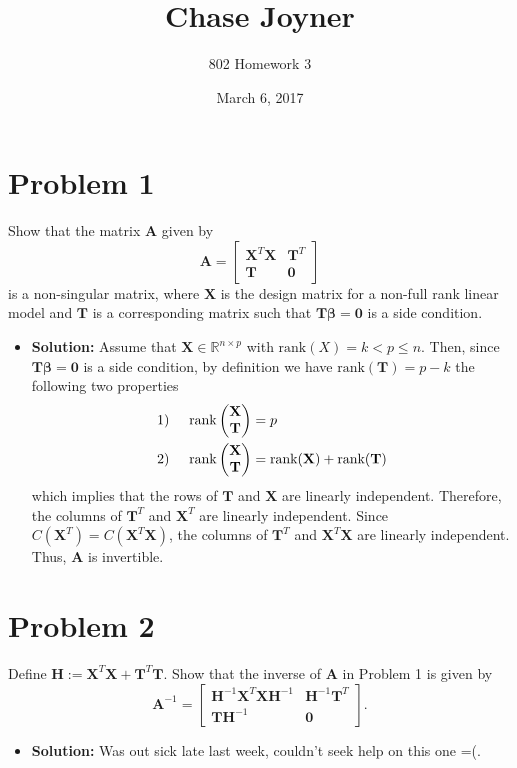 \documentclass[11pt]{article}
\title{Chase Joyner}
\author{802 Homework 3}
\date{March 6, 2017}
\newcommand{\XX}{\mathbf{X}^T\mathbf{X}}
\begin{document}
\maketitle

\section*{Problem 1}
Show that the matrix $\mathbf{A}$ given by
\[
\mathbf{A} = \begin{bmatrix}
\mathbf{X}^T\mathbf{X} & \mathbf{T}^T \\
\mathbf{T} & \mathbf{0}
\end{bmatrix}
\]
is a non-singular matrix, where $\mathbf{X}$ is the design matrix for a non-full rank linear model and $\mathbf{T}$ is a corresponding matrix such that $\mathbf{T}\bm\beta = \mathbf{0}$ is a side condition.
\begin{itemize}
\item[] \textbf{Solution:}  Assume that $\mathbf{X}\in\mathbb{R}^{n\times p}$ with $\text{rank}(X) = k<p\leq n$. Then, since $\mathbf{T}\bm\beta = \mathbf{0}$ is a side condition, by definition we have $\text{rank}(\mathbf{T}) = p - k$ the following two properties 
\begin{align*}
1) &\hspace{5mm} \text{rank}\begin{pmatrix}
\mathbf{X} \\ \mathbf{T}
\end{pmatrix} = p \\
2) &\hspace{5mm} \text{rank}\begin{pmatrix}
\mathbf{X} \\ \mathbf{T}
\end{pmatrix} = \text{rank}(\mathbf{X}) + \text{rank}(\mathbf{T})
\end{align*}
which implies that the rows of $\mathbf{T}$ and $\mathbf{X}$ are linearly independent.  Therefore, the columns of $\mathbf{T}^T$ and $\mathbf{X}^T$ are linearly independent.  Since $C(\mathbf{X}^T) = C(\mathbf{X}^T\mathbf{X})$, the columns of $\mathbf{T}^T$ and $\mathbf{X}^T\mathbf{X}$ are linearly independent.  Thus, $\mathbf{A}$ is invertible.
\end{itemize}

\section*{Problem 2}
Define $\mathbf{H}:= \mathbf{X}^T\mathbf{X} + \mathbf{T}^T\mathbf{T}$.  Show that the inverse of $\mathbf{A}$ in Problem 1 is given by
\[
\mathbf{A}^{-1} = \begin{bmatrix}
\mathbf{H}^{-1}\XX\mathbf{H}^{-1} & \mathbf{H}^{-1}\mathbf{T}^T \\
\mathbf{T}\mathbf{H}^{-1} & \mathbf{0}
\end{bmatrix}.
\]
\begin{itemize}
\item[] \textbf{Solution:}  Was out sick late last week, couldn't seek help on this one =(.
\end{itemize}
\end{document}
